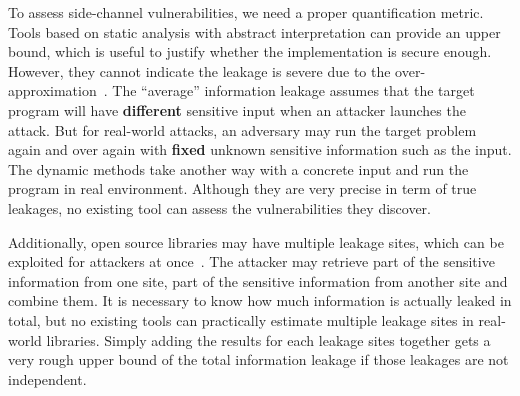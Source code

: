 To assess side-channel vulnerabilities, we need a proper quantification metric.
Tools based on static analysis with abstract interpretation can provide an upper bound, 
which is useful to justify whether the implementation is secure enough. 
However, they cannot indicate the leakage is severe due to the over-approximation~\cite{}. 
The ``average'' information leakage assumes that the target program will have 
\textbf{different} sensitive 
input when an attacker launches the attack.
But for real-world attacks, an adversary may run the target problem again and over again 
with \textbf{fixed} unknown sensitive information such as the input.
The dynamic methods take another way with a concrete input and run the program in real
environment. 
Although they are very precise in term of true leakages, no existing tool can
assess the vulnerabilities they discover.

Additionally, open source libraries may have multiple leakage sites, which can be exploited for attackers
at once~\cite{191010,7163052,hornby2011side}. 
The attacker may retrieve part of the sensitive information from one site, part of the sensitive
information from another site and combine them.
It is necessary to know how much information is actually leaked in total, 
but no existing tools can practically estimate multiple leakage sites in real-world libraries.
Simply adding the results for each leakage sites together gets a very rough upper bound of 
the total information leakage if those 
leakages are not independent. 

